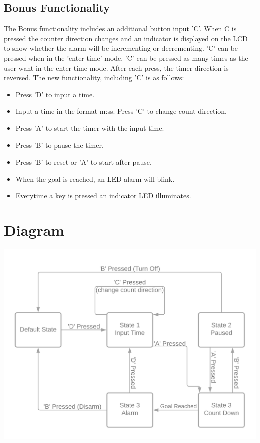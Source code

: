 \documentclass{article}
\begin{document}
\subsection{Bonus Functionality}
The Bonus functionality includes an additional button input 'C'. When C is pressed
the counter direction changes and an indicator is displayed on the LCD to show
whether the alarm will be incrementing or decrementing.  'C' can be pressed when in the 
'enter time' mode.  'C' can be pressed as many times as the user want in the enter time
mode.  After each press, the timer direction is reversed.
The new functionality, including 'C' is as follows:
\begin{itemize}
    \item Press 'D' to input a time.
    \item Input a time in the format m:ss. Press 'C' to change count direction.
    \item Press 'A' to start the timer with the input time.
    \item Press 'B' to pause the timer.
    \item Press 'B' to reset or 'A' to start after pause.
    \item When the goal is reached, an LED alarm will blink.
    \item Everytime a key is pressed an indicator LED illuminates.
\end{itemize}
\newpage

\section{Diagram}
\begin{center}
    {\includegraphics[height=10cm]{graphics/CSE321_project2_diagram.png}\centering} 
\end{center}
\end{document}

